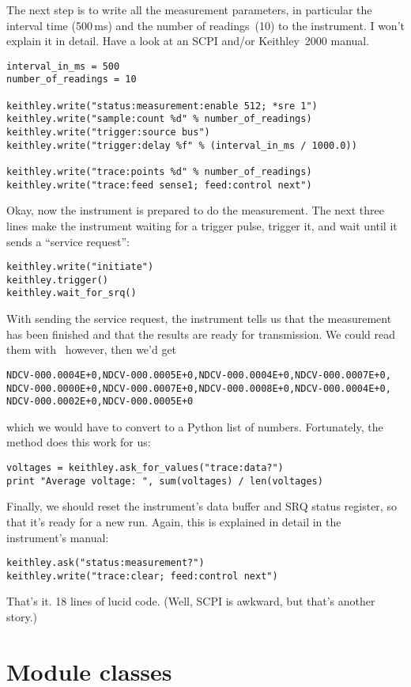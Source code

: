\documentclass{howto}
\begin{document}
The next step is to write all the measurement parameters, in particular the
interval time (500\,ms) and the number of readings~(10) to the instrument.  I
won't explain it in detail.  Have a look at an SCPI and/or Keithley~2000
manual.
\begin{verbatim}
interval_in_ms = 500
number_of_readings = 10

keithley.write("status:measurement:enable 512; *sre 1")
keithley.write("sample:count %d" % number_of_readings)
keithley.write("trigger:source bus")
keithley.write("trigger:delay %f" % (interval_in_ms / 1000.0))

keithley.write("trace:points %d" % number_of_readings)
keithley.write("trace:feed sense1; feed:control next")
\end{verbatim}
Okay, now the instrument is prepared to do the measurement.  The next three
lines make the instrument waiting for a trigger pulse, trigger it, and wait
until it sends a ``service request'':
\begin{verbatim}
keithley.write("initiate")
keithley.trigger()
keithley.wait_for_srq()
\end{verbatim}
With sending the service request, the instrument tells us that the measurement
has been finished and that the results are ready for transmission.  We could
read them with \ however, then we'd get
\begin{verbatim}
NDCV-000.0004E+0,NDCV-000.0005E+0,NDCV-000.0004E+0,NDCV-000.0007E+0,
NDCV-000.0000E+0,NDCV-000.0007E+0,NDCV-000.0008E+0,NDCV-000.0004E+0,
NDCV-000.0002E+0,NDCV-000.0005E+0
\end{verbatim}
which we would have to convert to a Python list of numbers.  Fortunately, the
 method does this work for us:
\begin{verbatim}
voltages = keithley.ask_for_values("trace:data?")
print "Average voltage: ", sum(voltages) / len(voltages)
\end{verbatim}
Finally, we should reset the instrument's data buffer and SRQ status register,
so that it's ready for a new run.  Again, this is explained in detail in the
instrument's manual:
\begin{verbatim}
keithley.ask("status:measurement?")
keithley.write("trace:clear; feed:control next")
\end{verbatim}
That's it.  18 lines of lucid code.  (Well, SCPI is awkward, but that's another
story.)


\section{Module classes}
\end{document}
